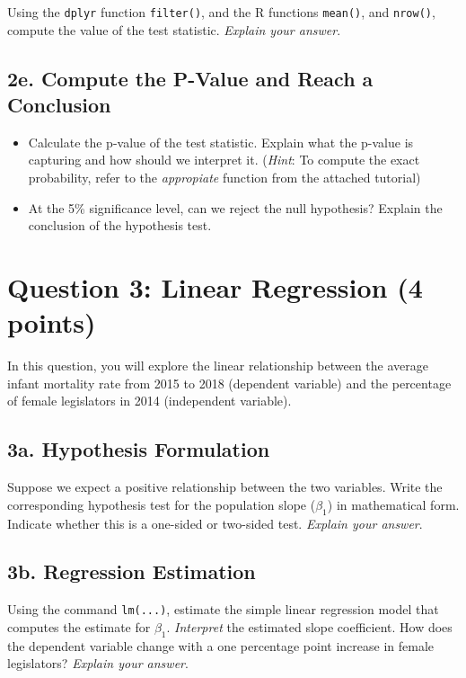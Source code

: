 \documentclass[a4paper, 11pt]{article}
\begin{document}
Using the \texttt{dplyr} function \texttt{filter()}, and the R functions \texttt{mean()}, and \texttt{nrow()}, compute the value of the test statistic. \textit{Explain your answer}.

\subsection*{2e. Compute the P-Value and Reach a Conclusion}
\begin{itemize}
    \item Calculate the p-value of the test statistic. Explain what the p-value is capturing and how should we interpret it. (\textit{Hint}: To compute the exact probability, refer to the \emph{appropiate} function from the attached tutorial)
    \item At the 5\% significance level, can we reject the null hypothesis? Explain the conclusion of the hypothesis test.
\end{itemize}

\section*{Question 3: Linear Regression (4 points)}

In this question, you will explore the linear relationship between the average infant mortality rate from 2015 to 2018 (dependent variable) and the percentage of female legislators in 2014 (independent variable).

\subsection*{3a. Hypothesis Formulation}

Suppose we expect a positive relationship between the two variables. Write the corresponding hypothesis test for the population slope ($\beta_1$) in mathematical form. Indicate whether this is a one-sided or two-sided test. \textit{Explain your answer}.

\subsection*{3b. Regression Estimation}

Using the command \texttt{lm(...)}, estimate the simple linear regression model that computes the estimate for $\beta_1$. \emph{Interpret} the estimated slope coefficient. How does the dependent variable change with a one percentage point increase in female legislators? \textit{Explain your answer}.
\end{document}
